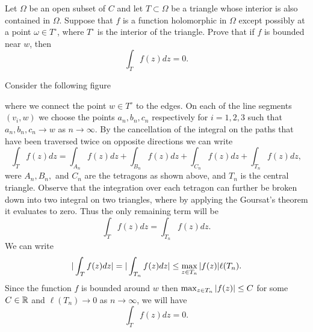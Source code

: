 \begin{problem}
	Let $ \Omega $ be an open subset of $ C $ and let $ T\subset \Omega $ be a triangle whose interior is also contained in $ \Omega $. Suppose that $ f $ is a function holomorphic in $ \Omega $ except possibly at a point $ \omega \in T^\circ $, where $ T^\circ $ is the interior of the triangle. Prove that if $ f $ is bounded near $ w $, then
	\[ \int_T f(z)dz  = 0. \]
\end{problem}
\begin{solution}
	Consider the following figure
	
	where we connect the point $ w \in T^\circ $ to the edges. On each of the line segments $ (v_i,w) $  we choose the points $ a_n,b_n,c_n $ respectively for $ i=1,2,3 $ such that $ a_n,b_n,c_n \to w $ as $ n \to \infty $. By the cancellation of the integral on the paths that have been traversed twice on opposite directions we can write
	\[ \int_{T}f(z)dz = \int_{A_n} f(z)dz + \int_{B_n}f(z)dz + \int_{C_n}f(z)dz + \int_{T_n}f(z)dz,  \]
	were $ A_n,B_n, $ and $ C_n $ are the tetragons as shown above, and $ T_n $ is the central triangle. Observe that the integration over each tetragon can further be broken down into two integral on two triangles, where by applying the Goursat's theorem it evaluates to zero. Thus the only remaining term will be
	\[ \int_{T} f(z)dz = \int_{T_n}f(z)dz. \]
	We can write
	\[ |\int_{T} f(z)dz| = |\int_{T_n}f(z)dz| \leq \max_{z\in T_n}|f(z)| \ell(T_n). \]
	Since the function $ f $ is bounded around $ w $ then $ \max_{z\in T_n}|f(z)| \leq C $ for some $ C\in \mathbb{R} $ and $ \ell(T_n)\to 0 $ as $ n\to\infty $, we will have
	\[ \int_T f(z) dz = 0. \]
\end{solution}


